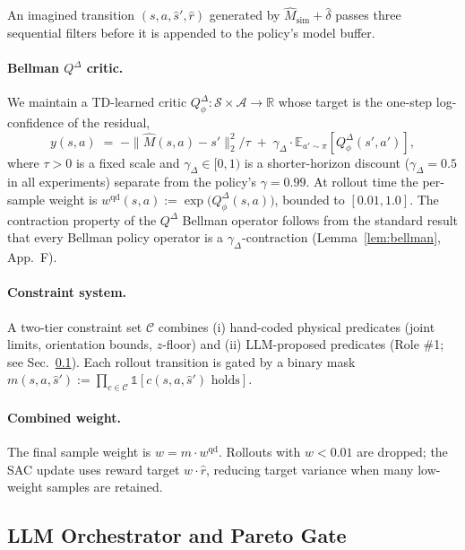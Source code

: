 \documentclass{article}
\theoremstyle{definition}
\newcommand{\QD}{Q^{\Delta}}
\begin{document}
An imagined transition $(s,a,\hat s',\hat r)$ generated by
$\hat M_{\mathrm{sim}}+\hat\delta$ passes three sequential filters before
it is appended to the policy's model buffer.

\paragraph{Bellman $\QD$ critic.}
We maintain a TD-learned critic $\QD_\phi:\mathcal S\times\mathcal A\to\mathbb R$
whose target is the one-step log-confidence of the residual,
\begin{equation}
y(s,a) \;=\; -\|\hat M(s,a) - s'\|_2^2/\tau \;+\; \gamma_\Delta \cdot \mathbb E_{a'\sim\pi}[\QD_\phi(s',a')],
\label{eq:qdelta-target}
\end{equation}
where $\tau>0$ is a fixed scale and $\gamma_\Delta\in[0,1)$ is a
shorter-horizon discount ($\gamma_\Delta=0.5$ in all experiments)
separate from the policy's $\gamma=0.99$.  At rollout time the per-sample
weight is $w^{\mathrm{qd}}(s,a) := \exp\bigl(\QD_\phi(s,a)\bigr)$, bounded
to $[0.01, 1.0]$.  The contraction property of the $\QD$ Bellman operator
follows from the standard result that every Bellman policy operator is a
$\gamma_\Delta$-contraction (Lemma~\ref{lem:bellman}, App.~F).

\paragraph{Constraint system.}  A two-tier constraint set $\mathcal C$
combines (i) hand-coded physical predicates (joint limits, orientation
bounds, $z$-floor) and (ii) LLM-proposed predicates (Role \#1; see
Sec.~\ref{sec:method-orch}).  Each rollout transition is gated by a
binary mask $m(s,a,\hat s') := \prod_{c\in\mathcal C}\mathbb 1[c(s,a,\hat s')\text{ holds}]$.

\paragraph{Combined weight.}  The final sample weight is
$w = m \cdot w^{\mathrm{qd}}$.  Rollouts with $w<0.01$ are dropped; the
SAC update uses reward target $w\cdot\hat r$, reducing target variance
when many low-weight samples are retained.

\subsection{LLM Orchestrator and Pareto Gate}
\label{sec:method-orch}
\end{document}
